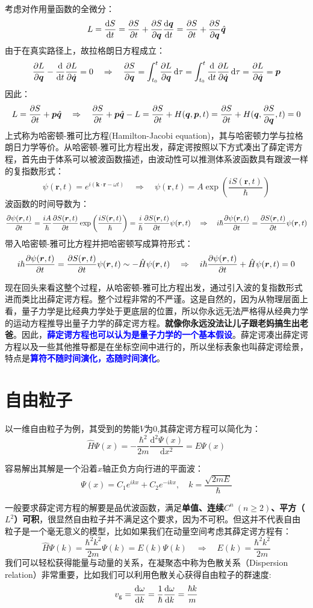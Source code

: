 考虑对作用量函数的全微分：
\[L=\dv{S}{t}=\pdv{S}{t}+\pdv{S}{\bm{q}}\dv{\bm{q}}{t}=\pdv{S}{t}+\pdv{S}{\bm{q}}\hat{\bm{q}}\]
由于在真实路径上，故拉格朗日方程成立：
\[\pdv{L}{\bm{q}}-\dv{t}\pdv{L}{\dot{\bm{q}}}=0 \quad \Rightarrow \quad \pdv{S}{\bm{q}}=\int_{t_0}^{t}\pdv{L}{\bm{q}}\dd{\tau}=\int_{t_0}^{t}\dv{t}\pdv{L}{\dot{\bm{q}}}\dd{\tau}=\pdv{L}{\dot{\bm{q}}}=\bm{p}\]
因此：
\[L=\pdv{S}{t}+\bm{p}\hat{\bm{q}} \quad \Rightarrow \quad \pdv{S}{t}+\bm{p}\hat{\bm{q}}-L=\pdv{S}{t}+H(\bm{q},\bm{p},t)=\pdv{S}{t}+H(\bm{q},\pdv{S}{\bm{q}},t)=0\]
上式称为哈密顿-雅可比方程(Hamilton-Jacobi equation)，其与哈密顿力学与拉格朗日力学等价。从哈密顿-雅可比方程出发，薛定谔按照以下方式凑出了薛定谔方程，首先由于体系可以被波函数描述，由波动性可以推测体系波函数具有跟波一样的复指数形式：
\[\psi(\bm{r},t)=e^{i(\bm{k}\cdot\bm{r}-\omega t)} \quad \Rightarrow \quad \psi(\bm{r},t)=A\exp\left(\frac{iS(\bm{r},t)}{\hbar}\right)\]
波函数的时间导数为：
\[\pdv{\psi(\bm{r},t)}{t}=\frac{iA}{\hbar}\pdv{S(\bm{r},t)}{t}\exp\left(\frac{iS(\bm{r},t)}{\hbar}\right)=\frac{i}{\hbar}\pdv{S(\bm{r},t)}{t}\psi(\bm{r},t) \quad \Rightarrow \quad i\hbar\pdv{\psi(\bm{r},t)}{t}=\pdv{S(\bm{r},t)}{t}\psi(\bm{r},t)\]
带入哈密顿-雅可比方程并把哈密顿写成算符形式：
\[i\hbar\pdv{\psi(\bm{r},t)}{t}=\pdv{S(\bm{r},t)}{t}\psi(\bm{r},t)\sim-\hat{H}\psi(\bm{r},t) \quad \Rightarrow \quad i\hbar\pdv{\psi(\bm{r},t)}{t}+\hat{H}\psi(\bm{r},t)=0\]

现在回头来看这整个过程，从哈密顿-雅可比方程出发，通过引入波的复指数形式进而类比出薛定谔方程。整个过程非常的不严谨。这是自然的，因为从物理层面上看，量子力学是比经典力学处于更底层的位置，所以你永远无法严格得从经典力学的运动方程推导出量子力学的薛定谔方程。\textbf{就像你永远没法让儿子跟老妈搞生出老爸}。因此，\textcolor{blue}{\textbf{薛定谔方程也可以认为是量子力学的一个基本假设}}。薛定谔凑出薛定谔方程以及一些其他推导都是在坐标空间中进行的，所以坐标表象也叫薛定谔绘景，特点是\textcolor{blue}{\textbf{算符不随时间演化，态随时间演化}}。

\section{自由粒子}
以一维自由粒子为例，其受到的势能$V$为0,其薛定谔方程可以简化为：
\[\hat{H}\varPsi(x)=-\frac{\hbar^2}{2m}\frac{\mathrm{d}^2\varPsi(x)}{\mathrm{d}x^2}=E\varPsi(x)\]

容易解出其解是一个沿着$x$轴正负方向行进的平面波：
\[\varPsi(x)=C_1e^{ikx}+C_2e^{-ikx}, \quad k=\frac{\sqrt{2mE}}{\hbar}\]

一般要求薛定谔方程的解要是品优波函数，满足\textbf{单值、连续$C^n \ (n \geq 2)$、平方（$L^2$）可积}，很显然自由粒子并不满足这个要求，因为不可积。但这并不代表自由粒子是一个毫无意义的模型，比如如果我们在动量空间考虑其薛定谔方程有：
\[\hat{H}\varPsi(k)=\frac{\hbar^2k^2}{2m}\varPsi(k)=E(k)\varPsi(k) \quad \Rightarrow \quad E(k)=\frac{\hbar^2k^2}{2m}\]
我们可以轻松获得能量与动量的关系，在凝聚态中称为色散关系（Dispersion relation）非常重要，比如我们可以利用色散关心获得自由粒子的群速度:
\[v_{\rm{g}}=\dv{\omega}{k}=\frac{1}{\hbar}\dv{\omega}{k}=\frac{\hbar k}{m}\]
